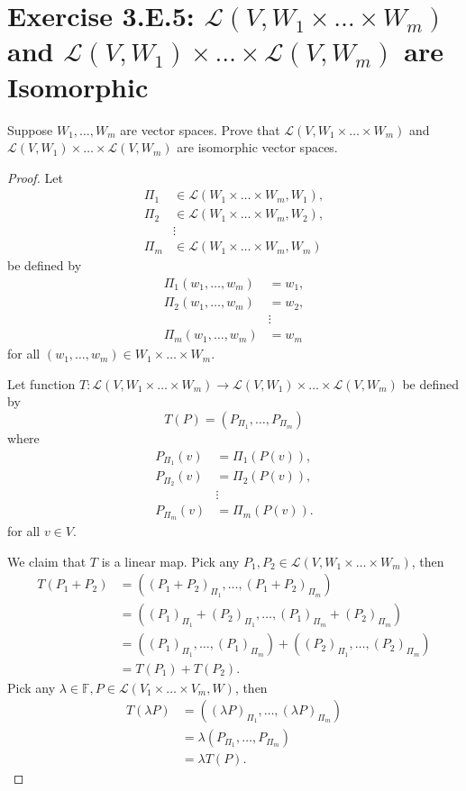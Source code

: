 \section{Exercise 3.E.5: $\mathcal{L}(V,W_1\times\dots\times W_m)$ and $\mathcal{L}(V, W_1)\times\dots\times\mathcal{L}(V,W_m)$ are Isomorphic}
Suppose $W_1,\dots,W_m$ are vector spaces. Prove that $\mathcal{L}(V,W_1\times\dots\times W_m)$ and $\mathcal{L}(V, W_1)\times\dots\times\mathcal{L}(V,W_m)$ are isomorphic vector spaces.
\begin{proof}
Let\[
\begin{split}
\Pi_1&\in\mathcal{L}(W_1\times\dots\times W_m, W_1),\\
\Pi_2&\in\mathcal{L}(W_1\times\dots\times W_m, W_2),\\
&\vdots\\
\Pi_m&\in\mathcal{L}(W_1\times\dots\times W_m, W_m)
\end{split}
\]be defined by\[
\begin{split}
\Pi_1(w_1,\dots,w_m)&=w_1,\\
\Pi_2(w_1,\dots,w_m)&=w_2,\\
&\vdots\\
\Pi_m(w_1,\dots,w_m)&=w_m
\end{split}
\]for all $(w_1,\dots,w_m)\in W_1\times\dots\times W_m$.

Let function $T:\mathcal{L}(V,W_1\times\dots\times W_m)\to\mathcal{L}(V, W_1)\times\dots\times\mathcal{L}(V,W_m)$ be defined by\[
T(P)=(P_{\Pi_1},\dots,P_{\Pi_m})
\]where\[
\begin{split}
P_{\Pi_1}(v)&=\Pi_1(P(v)),\\
P_{\Pi_2}(v)&=\Pi_2(P(v)),\\
&\vdots\\
P_{\Pi_m}(v)&=\Pi_m(P(v)).
\end{split}
\]for all $v\in V$.

We claim that $T$ is a linear map. Pick any $P_1,P_2\in\mathcal{L}(V,W_1\times\dots\times W_m)$, then\[
\begin{split}
T(P_1+P_2)&=((P_1+P_2)_{\Pi_1},\dots,(P_1+P_2)_{\Pi_m})\\
&=((P_1)_{\Pi_1}+(P_2)_{\Pi_1},\dots,(P_1)_{\Pi_m}+(P_2)_{\Pi_m})\\
&=((P_1)_{\Pi_1},\dots,(P_1)_{\Pi_m}) + ((P_2)_{\Pi_1},\dots,(P_2)_{\Pi_m})\\
&=T(P_1)+T(P_2).
\end{split}
\]Pick any $\lambda\in\mathbb{F}, P\in\mathcal{L}(V_1\times\dots\times V_m,W)$, then\[
\begin{split}
T(\lambda P)&=((\lambda P)_{\Pi_1},\dots,(\lambda P)_{\Pi_m})\\
&=\lambda(P_{\Pi_1},\dots,P_{\Pi_m})\\
&=\lambda T(P).
\end{split}
\]


\end{proof}
